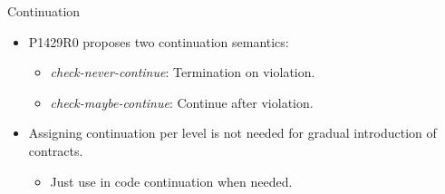 \begin{frame}[t]{Continuation}
\begin{itemize}
  \item P1429R0 proposes two continuation semantics:
    \begin{itemize}
      \item \emph{check-never-continue}: Termination on violation.
      \item \emph{check-maybe-continue}: Continue after violation.      
    \end{itemize}

  \vfill
  \item Assigning continuation per level is not needed for gradual introduction
	  of contracts.
    \begin{itemize}
      \item Just use in code continuation when needed.
    \end{itemize}
\end{itemize}
\end{frame}

